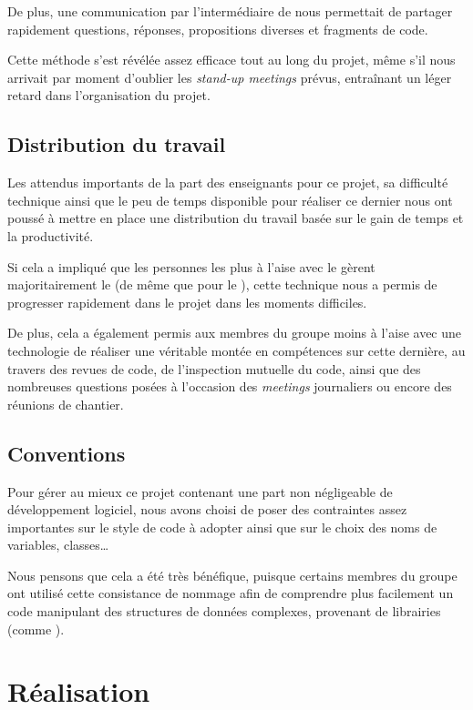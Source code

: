 \documentclass[a4paper, 11pt, twoside]{book}
\begin{document}
De plus, une communication par l'intermédiaire de  nous permettait de partager rapidement questions, réponses, propositions diverses et fragments de code.

Cette méthode s'est révélée assez efficace tout au long du projet, même s'il nous arrivait par moment d'oublier les \emph{stand-up meetings} prévus, entraînant un léger retard dans l'organisation du projet.

\section{Distribution du travail}

Les attendus importants de la part des enseignants pour ce projet, sa difficulté technique ainsi que le peu de temps disponible pour réaliser ce dernier nous ont poussé à mettre en place une distribution du travail basée sur le gain de temps et la productivité.

Si cela a impliqué que les personnes les plus à l'aise avec le  gèrent majoritairement le  (de même que pour le ), cette technique nous a permis de progresser rapidement dans le projet dans les moments difficiles.

De plus, cela a également permis aux membres du groupe moins à l'aise avec une technologie de réaliser une véritable montée en compétences sur cette dernière, au travers des revues de code, de l'inspection mutuelle du code, ainsi que des nombreuses questions posées à l'occasion des \emph{meetings} journaliers ou encore des réunions de chantier.

\newpage
\section{Conventions}

Pour gérer au mieux ce projet contenant une part non négligeable de développement logiciel, nous avons choisi de poser des contraintes assez importantes sur le style de code à adopter ainsi que sur le choix des noms de variables, classes\ldots{}

Nous pensons que cela a été très bénéfique, puisque certains membres du groupe ont utilisé cette consistance de nommage afin de comprendre plus facilement un code manipulant des structures de données complexes, provenant de librairies (comme ).


\chapter{Réalisation}
\end{document}
